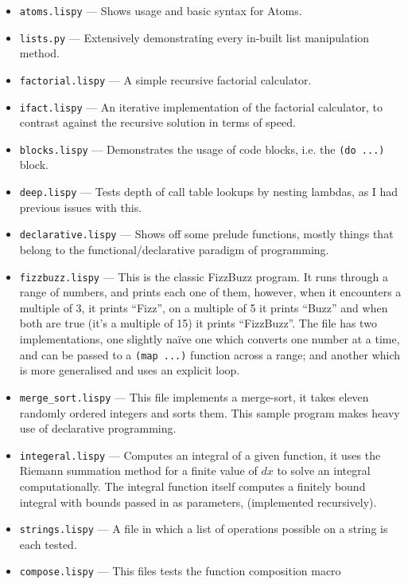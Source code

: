 \documentclass{article}
\newcommand{\code}[1]{\texttt{#1}}
\begin{document}
    \begin{itemize}
      \item \code{atoms.lispy} --- Shows usage and basic syntax for Atoms.
      \item \code{lists.py} --- Extensively demonstrating every in-built
      list manipulation method.
      \item \code{factorial.lispy} --- A simple recursive factorial calculator.
      \item \code{ifact.lispy} --- An iterative implementation of the factorial
      calculator, to contrast against the recursive solution in terms of speed.
      \item \code{blocks.lispy} --- Demonstrates the usage of code blocks, i.e.
      the \code{(do ...)} block.
      \item \code{deep.lispy} --- Tests depth of call table lookups by nesting
      lambdas, as I had previous issues with this.
      \item \code{declarative.lispy} --- Shows off some prelude functions, mostly
      things that belong to the functional/declarative paradigm of programming.
      \item \code{fizzbuzz.lispy} --- This is the classic FizzBuzz program.
      It runs through a range of numbers, and prints each one of them, however,
      when it encounters a multiple of 3, it prints ``Fizz'', on a multiple of
      5 it prints ``Buzz'' and when both are true (it's a multiple of 15)
      it prints ``FizzBuzz''. The file has two implementations, one slightly na\"ive one
      which converts one number at a time, and can be passed to a \code{(map ...)}
      function across a range; and another which is more generalised and uses
      an explicit loop.
      \item \code{merge\_sort.lispy} --- This file implements a merge-sort, it
      takes eleven randomly ordered integers and sorts them. This sample program
      makes heavy use of declarative programming.
      \item \code{integeral.lispy} --- Computes an integral of a given function,
      it uses the Riemann summation method for a finite value of $dx$ to solve
      an integral computationally. The integral function itself computes a
      finitely bound integral with bounds passed in as parameters, (implemented recursively).
      \item \code{strings.lispy} --- A file in which a list of operations possible on
      a string is each tested.
      \item \code{compose.lispy} --- This files tests the function composition macro

\end{itemize}
\end{document}
